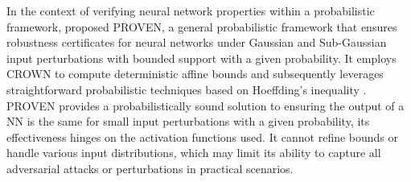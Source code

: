 \begin{comment}
\efi{Is this local robustness really relevant to our paper? Seems to me it's about "deterministic" robustness.} The local robustness property in classification problems can be formulated as follows.
A neural network $f$ is locally robust at $x_{0}$  if
\begin{align*}
\forall x: \parallel x - x_{0}\parallel \leq \epsilon \xrightarrow[]{} f(x) = f(x_{0})
\end{align*}
 for some positive $\epsilon$ ($\epsilon$-robust),   where $\parallel \cdot \parallel$ is some distance measure. 
It is typical to consider $l_{1}$, $l_{2}$ or $l_{\infty}$ norms as distance measures, with the latter %
being the most popular.

Interval Bound Propagation (IBP) \cite{Gowaletal_2018} provides certified robustness against \textit{nonrandom} adversarial perturbations by deriving constant-type bounds for output neurons based on input ranges. Linear Relaxation Perturbation Analysis (LiRPA) \cite{Xuetal_2020} generalizes bounds computation using a graph-based approach, expressing neural networks as computational graphs to construct affine bounds for intermediate nodes. CROWN and CROWN-IBP \cite{Zhangetal2018,Zhangetal2020} certify robustness for neural networks with general activation functions. CROWN bounds non-piecewise-linear activations using linear and quadratic functions, while CROWN-IBP combines IBP's efficiency with CROWN's tighter linear relaxation bounds.  GenBaB \cite{Shietal2024} extends branch-and-bound (BaB) frameworks \cite{Buneletal_2019,Ferrarietal_2022} to verify neural networks with general nonlinearities by combining linear bound propagation and optimized branching strategies, supporting activations like Sigmoid, Tanh, GeLU, and multidimensional operations. Finally, SMT-based frameworks like Reluplex \cite{Katzetal_2017} and Marabou \cite{Katzetal_2019,Wuetal_2024} verify neural networks by transforming property queries into constraint satisfaction problems, handling diverse activation functions and topologies with parallel execution for scalability.
\end{comment}


In the context of verifying neural network properties within a probabilistic framework,  \cite{Wengetal2019} proposed PROVEN, a general probabilistic framework that ensures robustness certificates for neural networks under Gaussian and Sub-Gaussian input perturbations with bounded support with a given probability. It employs CROWN \cite{Zhangetal2018,Zhangetal2020} to compute deterministic affine bounds and subsequently leverages straightforward probabilistic techniques based on Hoeffding's inequality \cite{Hoeffding1963}.  PROVEN provides a probabilistically sound solution to ensuring the output of a NN is the same for small input perturbations with a given probability, its effectiveness hinges on the activation functions used. It cannot refine bounds or handle various input distributions, which may limit its ability to capture all adversarial attacks or perturbations in practical scenarios.

